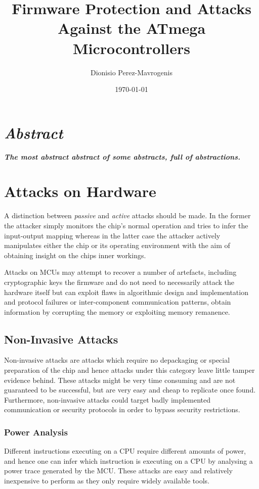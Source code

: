\documentclass[10pt,a4paper,twocolumn]{article}
\author{Dionisio Perez-Mavrogenis}
\title{Firmware Protection and Attacks Against the ATmega Microcontrollers}
\date{\today}
\begin{document}
	\maketitle
	
\section*{\emph{Abstract}}
	\textbf{\emph{The most abstract abstract of some abstracts, full of abstractions.}}
	




\section{Attacks on Hardware}
\label{sec:curr_attacks}
A distinction between \emph{passive} and \emph{active} attacks should be made. In the former the attacker simply monitors the chip's normal operation and tries to infer the input-output mapping whereas in the latter case the attacker actively manipulates either the chip or its operating environment with the aim of obtaining insight on the chips inner workings. 

Attacks on MCUs may attempt to recover a number of artefacts, including cryptographic keys the firmware and do not need to necessarily attack the hardware itself but can exploit flaws in algorithmic design and implementation and protocol failures or inter-component communication patterns\citep{anderson:cautionary_note}\citep{kocher:DPA}, obtain information by corrupting the memory or exploiting memory remanence\citep{sergei:thesis}\citep{gutman:memory_remanence}.

	\subsection{Non-Invasive Attacks}
	Non-invasive attacks are attacks which require no depackaging or special preparation of the chip and hence attacks under this category leave little tamper evidence behind. These attacks might be very time consuming and are not guaranteed to be successful, but are very easy and cheap to replicate once found. Furthermore, non-invasive attacks could target badly implemented communication or security protocols in order to bypass security restrictions.
	
	\subsubsection{Power Analysis}
	\label{subsubsec:power_analysis}
	Different instructions executing on a CPU require different amounts of power, and hence one can infer which instruction is executing on a CPU by analysing a power trace generated by the MCU. These attacks are easy and relatively inexpensive to perform as they only require widely available tools.
	
\end{document}
